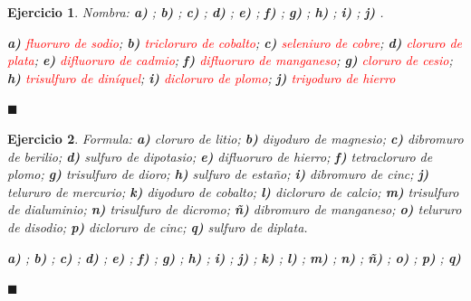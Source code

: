 \documentclass[12pt]{article}
\theoremstyle{mygreennumbox}
\newtheorem{ejercicioT}{Ejercicio}[section]
\newenvironment{exercise}{\begin{eBoxmygreen}\begin{ejercicioT}}{\hfill{\color{mygreen}\tiny\ensuremath{\blacksquare}}\end{ejercicioT}\end{eBoxmygreen}}
\begin{document}
\begin{exercise}
    Nombra: \textbf{a)} ; \textbf{b)} ; \textbf{c)} ; \textbf{d)} ; \textbf{e)} ; \textbf{f)} ; \textbf{g)} ; \textbf{h)} ; \textbf{i)} ; \textbf{j)} .
    \begin{solu}
        \textbf{a)} \textcolor{red}{fluoruro de sodio}; \textbf{b)} \textcolor{red}{tricloruro de cobalto}; \textbf{c)} \textcolor{red}{seleniuro de cobre}; \textbf{d)} \textcolor{red}{cloruro de plata}; \textbf{e)} \textcolor{red}{difluoruro de cadmio}; \textbf{f)} \textcolor{red}{difluoruro de manganeso}; \textbf{g)} \textcolor{red}{cloruro de cesio}; \textbf{h)} \textcolor{red}{trisulfuro de diníquel}; \textbf{i)} \textcolor{red}{dicloruro de plomo}; \textbf{j)} \textcolor{red}{triyoduro de hierro}
    \end{solu}
\end{exercise}

\begin{exercise}
    Formula: \textbf{a)} cloruro de litio; \textbf{b)} diyoduro de magnesio; \textbf{c)} dibromuro de berilio; \textbf{d)} sulfuro de dipotasio; \textbf{e)} difluoruro de hierro; \textbf{f)} tetracloruro de plomo; \textbf{g)} trisulfuro de dioro; \textbf{h)} sulfuro de estaño; \textbf{i)} dibromuro de cinc; \textbf{j)} telururo de mercurio; \textbf{k)} diyoduro de cobalto; \textbf{l)} dicloruro de calcio; \textbf{m)} trisulfuro de dialuminio; \textbf{n)} trisulfuro de dicromo; \textbf{ñ)} dibromuro de manganeso; \textbf{o)} telururo de disodio; \textbf{p)} dicloruro de cinc; \textbf{q)} sulfuro de diplata.
    \begin{solu}
        \textbf{a)} \textcolor{red}{}; \textbf{b)} \textcolor{red}{}; \textbf{c)} \textcolor{red}{}; \textbf{d)} \textcolor{red}{}; \textbf{e)} \textcolor{red}{}; \textbf{f)} \textcolor{red}{}; \textbf{g)} \textcolor{red}{}; \textbf{h)} \textcolor{red}{}; \textbf{i)} \textcolor{red}{}; \textbf{j)} \textcolor{red}{}; \textbf{k)} \textcolor{red}{}; \textbf{l)} \textcolor{red}{}; \textbf{m)} \textcolor{red}{}; \textbf{n)} \textcolor{red}{}; \textbf{ñ)} \textcolor{red}{}; \textbf{o)} \textcolor{red}{}; \textbf{p)} \textcolor{red}{}; \textbf{q)} \textcolor{red}{}
    \end{solu}
\end{exercise}
\end{document}
